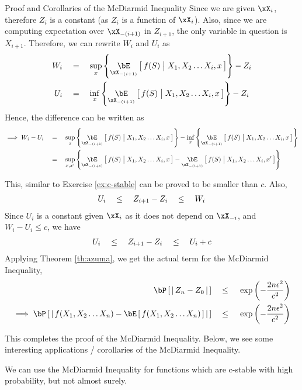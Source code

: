 \documentclass{article}
\begin{document}
\begin{ssection}{Proof and Corollaries of the McDiarmid Inequality}
	Since we are given $\xX_i$, therefore $Z_i$ is a constant (as $Z_i$ is a function of $\xX_i$). Also, since we are computing expectation over $\xX_{- (i + 1)}$ in $Z_{i + 1}$, the only variable in question is $X_{i + 1}$. Therefore, we can rewrite $W_i$ and $U_i$ as
	\begin{align*}
		W_i & \eq	\sup_{x} \set{\E[\xX_{-(i + 1)}]{f(S) \pipe X_1, X_2 \dots X_i, x}} - Z_i \\
		U_i & \eq	\inf_{x} \set{\E[\xX_{-(i + 1)}]{f(S) \pipe X_1, X_2 \dots X_i, x}} - Z_i 
	\end{align*}
	Hence, the difference can be written as
	\begin{align*}
		\implies W_i - U_i & \eq	\sup_{x} \set{\E[\xX_{-(i + 1)}]{f(S) \pipe X_1, X_2 \dots X_i, x}} - \inf_{x} \set{\E[\xX_{-(i + 1)}]{f(S) \pipe X_1, X_2 \dots X_i, x}} \\
		                   & \eq	\sup_{x, x'} \set{\E[\xX_{-(i + 1)}]{f(S) \pipe X_1, X_2 \dots X_i, x} - \E[\xX_{-(i + 1)}]{f(S) \pipe X_1, X_2 \dots X_i, x'}}           
	\end{align*}
	
	This, similar to Exercise \ref{ex:c-stable} can be proved to be smaller than $c$. Also,
	\begin{align*}
		U_i	\quad \le \quad	Z_{i + 1} - Z_i	\quad \le \quad	W_i 
	\end{align*}
	Since $U_i$ is a constant given $\xX_i$ as it does not depend on $\xX_{-i}$, and $W_i - U_i \le c$, we have
	\begin{align*}
		U_i	\quad \le \quad	Z_{i + 1} - Z_i	\quad \le \quad	U_i + c 
	\end{align*}
	Applying Theorem \ref{th:azuma}, we get the actual term for the McDiarmid Inequality, \ie
	\begin{align*}
		\prob{\abs{Z_n - Z_0}}	\qle	\texp{- \frac{2 n \epsilon^2}{c^2}}                                                  \\
		\implies \prob{\abs{f(X_1, X_2 \dots X_n) - \E{f(X_1, X_2 \dots X_n)}}}	\qle	\texp{- \frac{2 n \epsilon^2}{c^2}} 
	\end{align*}
	
	This completes the proof of the McDiarmid Inequality. Below, we see some interesting applications / corollaries of the McDiarmid Inequality. \br
	
	\begin{remark}
		We can use the McDiarmid Inequality for functions which are c-stable with high probability, but not almost surely.
	\end{remark} \br
	

\end{ssection}
\end{document}
